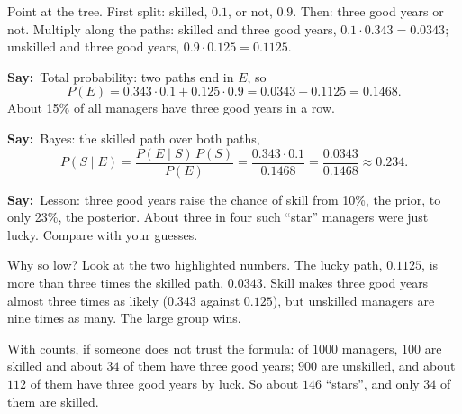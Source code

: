\documentclass[11pt,a4paper,parskip=half]{scrartcl}
\newcommand{\say}{\textbf{\color{teal}Say:}\ }
\begin{document}
Point at the tree. First split: skilled, $0.1$, or not, $0.9$. Then: three
good years or not. Multiply along the paths: skilled and three good years,
$0.1\cdot0.343=0.0343$; unskilled and three good years,
$0.9\cdot0.125=0.1125$.

\say Total probability: two paths end in $E$, so
\[ P(E)=0.343\cdot0.1+0.125\cdot0.9=0.0343+0.1125=0.1468. \]
About 15\% of all managers have three good years in a row.

\say Bayes: the skilled path over both paths,
\[ P(S\mid E)=\frac{P(E\mid S)\,P(S)}{P(E)}=\frac{0.343\cdot0.1}{0.1468}
	=\frac{0.0343}{0.1468}\approx0.234. \]

\say Lesson: three good years raise the chance of skill from 10\%, the
prior, to only 23\%, the posterior. About three in four such ``star'' managers
were just lucky. Compare with your guesses.

Why so low? Look at the two highlighted numbers. The lucky path,
$0.1125$, is more than three times the skilled path, $0.0343$. Skill makes
three good years almost three times as likely ($0.343$ against $0.125$),
but unskilled managers are nine times as many. The large group wins.

With counts, if someone does not trust the formula: of $1000$ managers,
$100$ are skilled and about $34$ of them have three good years; $900$ are
unskilled, and about $112$ of them have three good years by luck. So
about $146$ ``stars'', and only $34$ of them are skilled.
\end{document}
